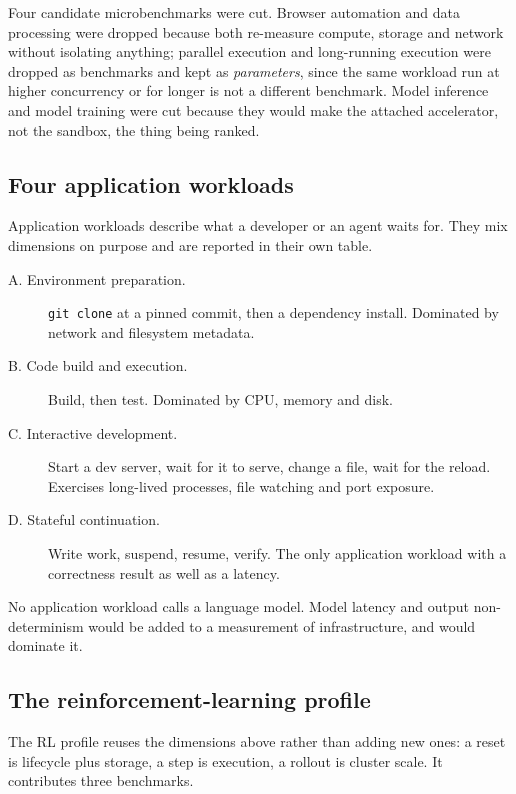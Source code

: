 Four candidate microbenchmarks were cut. Browser automation and data
processing were dropped because both re-measure compute, storage and network
without isolating anything; parallel execution and long-running execution were
dropped as benchmarks and kept as \emph{parameters}, since the same workload
run at higher concurrency or for longer is not a different benchmark. Model
inference and model training were cut because they would make the attached
accelerator, not the sandbox, the thing being ranked.

\subsection{Four application workloads}

Application workloads describe what a developer or an agent waits for. They
mix dimensions on purpose and are reported in their own table.

\begin{description}
  \item[A. Environment preparation.] \texttt{git clone} at a pinned commit,
  then a dependency install. Dominated by network and filesystem metadata.
  \item[B. Code build and execution.] Build, then test. Dominated by CPU,
  memory and disk.
  \item[C. Interactive development.] Start a dev server, wait for it to serve,
  change a file, wait for the reload. Exercises long-lived processes, file
  watching and port exposure.
  \item[D. Stateful continuation.] Write work, suspend, resume, verify. The
  only application workload with a correctness result as well as a latency.
\end{description}

No application workload calls a language model. Model latency and output
non-determinism would be added to a measurement of infrastructure, and would
dominate it.

\subsection{The reinforcement-learning profile}

The RL profile reuses the dimensions above rather than adding new ones: a
reset is lifecycle plus storage, a step is execution, a rollout is cluster
scale. It contributes three benchmarks.

